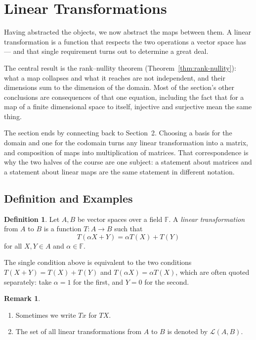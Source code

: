\documentclass[11pt,a4paper]{article}
\theoremstyle{definition}
\newtheorem{defn}[thm]{Definition}
\newtheorem*{remark}{Remark}
\begin{document}
\pagebreak
\section{Linear Transformations}
Having abstracted the objects, we now abstract the maps between them. A linear
transformation is a function that respects the two operations a vector space
has --- and that single requirement turns out to determine a great deal.

The central result is the rank--nullity theorem
(Theorem~\ref{thm:rank-nullity}): what a map collapses and what it reaches are
not independent, and their dimensions sum to the dimension of the domain. Most
of the section's other conclusions are consequences of that one equation,
including the fact that for a map of a finite dimensional space to itself,
injective and surjective mean the same thing.

The section ends by connecting back to Section~2. Choosing a basis for the
domain and one for the codomain turns any linear transformation into a matrix,
and composition of maps into multiplication of matrices. That correspondence is
why the two halves of the course are one subject: a statement about matrices
and a statement about linear maps are the same statement in different
notation.

\subsection{Definition and Examples}
\begin{defn}
Let $A,B$ be vector spaces over a field $\mathbb{F}$. A \emph{linear
transformation} from $A$ to $B$ is a function $T:A\longrightarrow B$ such that
$$T(\alpha X+Y)=\alpha T(X)+T(Y)$$
for all $X,Y\in A$ and $\alpha \in \mathbb{F}$.

The single condition above is equivalent to the two conditions
$T(X+Y)=T(X)+T(Y)$ and $T(\alpha X)=\alpha T(X)$, which are often quoted
separately: take $\alpha=1$ for the first, and $Y=0$ for the second.
\end{defn}


\begin{remark}
\begin{enumerate}
\item[i.] Sometimes we write $Tx$ for $TX$.
\item[ii.] The set of all linear transformations from $A$ to $B$ is denoted by $\mathcal{L}(A,B)$.
\end{enumerate}
\end{remark}
\end{document}
